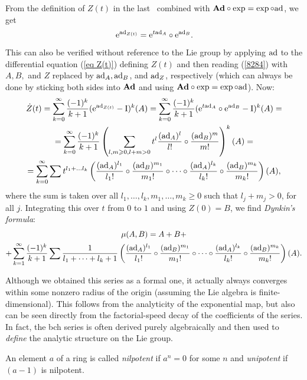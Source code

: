 From the definition of $Z(t)$ in the last \subsect\ combined with $\mathrm{\mathbf{Ad}}\circ \exp=\exp\circ\mathrm{ad}$, we get
\[\mathrm{e}^{\mathrm{ad}_{Z(t)}}=\mathrm{e}^{t\mathrm{ad}_A}\circ \mathrm{e}^{\mathrm{ad}_B}.\]
This can also be verified without reference to the Lie group by applying $\mathrm{ad}$ to the differential equation (\ref{eq Z(t)}) defining $Z(t)$ and then reading (\ref{8284}) with $A,B,$ and $Z$ replaced by $\mathrm{ad}_A,\mathrm{ad}_B$, and $\mathrm{ad}_Z$, respectively (which can always be done by sticking both sides into $\mathrm{\mathbf{Ad}}$ and using $\mathrm{\mathbf{Ad}}\circ\exp=\exp\circ\mathrm{ad}$). Now:
\begin{multline}
    \dot Z(t)=\sum_{k=0}^\infty \frac{(-1)^k}{k+1}(\mathrm{e}^{\mathrm{ad}_{Z(t)}}-\mathrm{I})^k(A)=\sum_{k=0}^\infty \frac{(-1)^k}{k+1}(\mathrm{e}^{t\mathrm{ad}_A}\circ \mathrm{e}^{\mathrm{ad}_B}-\mathrm{I})^k(A)=\\
    =\sum_{k=0}^\infty \frac{(-1)^k}{k+1}\left(\sum_{l,m\geqslant 0,l+m>0}t^l\frac{(\mathrm{ad}_A)^l}{l!}\circ \frac{(\mathrm{ad}_B)^m}{m!}\right)^k (A)=\\
    =\sum_{k=0}^\infty \sum t^{l_1+\ldots l_k}
    \left(
    \frac{(\mathrm{ad}_A)^{l_1}}{l_1!}\circ
    \frac{(\mathrm{ad}_B)^{m_1}}{m_1!}\circ\cdots\circ
    \frac{(\mathrm{ad}_A)^{l_k}}{l_k!}\circ
    \frac{(\mathrm{ad}_B)^{m_k}}{m_k!}
    \right)(A),
\end{multline}
where the sum is taken over all $l_1,\ldots,l_k,m_1,\ldots,m_k\geq 0$ such that $l_j+m_j>0$, for all $j$. Integrating this over $t$ from $0$ to $1$ and using $Z(0)=B$, we find \emph{Dynkin's formula}:
\begin{multline}
    \mu(A,B)=A+B+\\+\sum_{k=1}^\infty \frac{(-1)^k}{k+1}\sum \frac{1}{l_1+\cdots+l_k+1}\left(    
    \frac{(\mathrm{ad}_A)^{l_1}}{l_1!}\circ
    \frac{(\mathrm{ad}_B)^{m_1}}{m_1!}\circ\cdots\circ
    \frac{(\mathrm{ad}_A)^{l_k}}{l_k!}\circ
    \frac{(\mathrm{ad}_B)^{m_k}}{m_k!}\right)(A).
\end{multline}

\begin{rem}
    Although we obtained this series as a formal one, it actually always converges within some nonzero radius of the origin (assuming the Lie algebra is finite-dimensional). This follows from the analyticity of the exponential map, but also can be seen directly from the factorial-speed decay of the coefficients of the series. In fact, the \gls{bch} series is often derived purely algebraically and then used to \emph{define} the analytic structure on the Lie group.
\end{rem}

An element $a$ of a ring is called \emph{nilpotent} if $a^n=0$ for some $n$ and \emph{unipotent} if $(a-1)$ is nilpotent.


